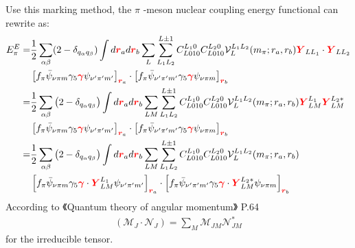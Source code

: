 \documentclass[a4paper]{article}
\newcommand{\no}{\nonumber}
\newcommand{\bmm}[1]{{\color{red}\bm{#1}}}
\begin{document}
Use this marking method, the $\pi$ -meson nuclear coupling energy functional can rewrite as:
\begin{align}
\no E_{\pi}^{E}=&\frac{1}{2}\sum_{\alpha\beta}(2-\delta_{q_{\alpha}q_{\beta}})\int d\bmm{r}_{a}d\bmm{r}_{b}\sum_{L}\sum_{L_{1}L_{2}}^{L\pm1}C_{L010}^{L_{1}0}C_{L010}^{L_{2}0}\mathcal{V}_{L}^{L_1L_2}(m_{\pi};r_{a},r_{b})\bmm{Y}_{LL_{1}}\cdot\bmm{Y}_{LL_{2}}\\
\no&\left[f_{\pi}\bar{\psi}_{\nu\pi m}\gamma_{5}\bmm{\gamma}\psi_{\nu'\pi'm'}\right]_{\bmm{r}_{a}}\cdot\left[f_{\pi}\bar{\psi}_{\nu'\pi'm'}\gamma_{5}\bmm{\gamma}\psi_{\nu\pi m}\right]_{\bmm{r}_{b}}\\
\no=&\frac{1}{2}\sum_{\alpha\beta}\left(2-\delta_{q_{\alpha}q_{\beta}}\right)\int d\bmm{r}_{a}d\bmm{r}_{b}\sum_{LM}\sum_{L_{1}L_{2}}^{L\pm1}C_{L010}^{L_{1}0}C_{L010}^{L_{2}0}\mathcal{V}_{L}^{L_{1}L_{2}}(m_{\pi};r_{a},r_{b})\bmm{Y}_{LM}^{L_{1}}\bmm{Y}_{LM}^{L_{2}*}\\
\no&\left[f_{\pi}\bar{\psi}_{\nu\pi m}\gamma_{5}\bmm{\gamma}\psi_{\nu'\pi'm'}\right]_{\bmm{r}_{a}}\cdot\left[f_{\pi}\bar{\psi}_{\nu'\pi'm'}\gamma_{5}\bmm{\gamma}\psi_{\nu\pi m}\right]_{\bmm{r}_{b}}\\
\no=&\frac{1}{2}\sum_{\alpha\beta}\left(2-\delta_{q_{\alpha}q_{\beta}}\right)\int d\bmm{r}_{a}d\bmm{r}_{b}\sum_{LM}\sum_{L_{1}L_{2}}^{L\pm1}C_{L010}^{L_{1}0}C_{L010}^{L_{2}0}\mathcal{V}_{L}^{L_{1}L_{2}}(m_{\pi};r_{a},r_{b})\\
\no&\left[f_{\pi}\bar{\psi}_{\nu\pi m}\gamma_{5}\bmm{\gamma}\cdot\bmm{Y}_{LM}^{L_{1}}\psi_{\nu'\pi'm'}\right]_{\bmm{r}_{a}}\cdot\left[f_{\pi}\bar{\psi}_{\nu'\pi'm'}\gamma_{5}\bmm{\gamma}\cdot\bmm{Y}_{LM}^{L_{2}*}\psi_{\nu\pi m}\right]_{\bmm{r}_{b}}
\end{align}
According to 《Quantum theory of angular momentum》 P.64
\begin{align}
\left(\mathscr{M}_{J}\cdot\mathscr{N}_{J}\right)=\sum_{M}\mathscr{M}_{JM}\mathscr{N}_{JM}^{*}
\end{align}
for the irreducible tensor.
\end{document}
